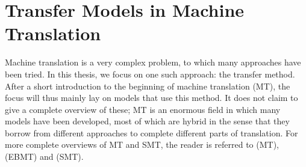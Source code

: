 \documentclass{report}
\theoremstyle{definition}
\theoremstyle{plain}
\begin{document}

\chapter{Transfer Models in Machine Translation}


Machine translation is a very complex problem, to which many approaches have been tried. In this thesis, we focus on one such approach: the transfer method.   After a short introduction to the beginning of machine translation (MT), the focus will thus mainly lay on models that use this method. It does not claim to give a complete overview of these; MT is an enormous field in which many models have been developed, most of which are hybrid in the sense that they borrow from different approaches to complete different parts of translation. For more complete overviews of MT and SMT, the reader is referred to \cite{hutchins1992introduction} (MT), \cite{somers1999review} (EBMT) and \cite{koehn2008statistical} (SMT).
\end{document}
